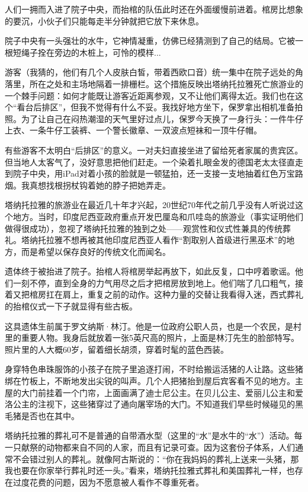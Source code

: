\documentclass[12pt,oneside]{book}
\begin{document}
人们一拥而入进了院子中央，而抬棺的队伍此时还在外面缓慢前进着。棺房比想象的要沉，小伙子们只能每走半分钟就把它放下来休息。

院子中央有一头强壮的水牛，它神情凝重，仿佛已经猜测到了自己的结局。它被一根短绳子拴在旁边的木桩上，可怜的模样...

游客（我猜的，他们有几个人皮肤白皙，带着西欧口音）统一集中在院子远处的角落里，所在之处和主场地隔着一排栅栏。这个措施反映出塔纳托拉雅死亡旅游业的一个棘手问题：如何才能既让游客近距离参观，又不让他们离得太近。我们也在这个“看台后排区”，但我不觉得有什么不妥。我找好地方坐下，保罗拿出相机准备拍照。为了让自己在闷热潮湿的天气里好过点儿，保罗今天换了一身行头：一件牛仔上衣、一条牛仔工装裤、一个警长徽章、一双波点短袜和一顶牛仔帽。

有些游客不太明白“后排区”的意义。一对夫妇直接坐进了留给死者家属的贵宾区。但当地人太客气了，没好意思把他们赶走。一个染着扎眼金发的德国老太太径直走到院子中央，用iPad对着小孩的脸就是一顿猛拍，还一支接一支地抽着红色万宝路烟。我真想找根拐杖钩着她的脖子把她弄走。

塔纳托拉雅的旅游业在最近几十年才兴起，20世纪70年代之前几乎没有人听说过这个地方。当时，印度尼西亚政府重点开发巴厘岛和爪哇岛的旅游业（事实证明他们做得很成功），忽视了塔纳托拉雅的独到之处——观赏性和仪式性兼具的传统葬礼。塔纳托拉雅不想再被其他印度尼西亚人看作“割取别人首级进行黑巫术”的地方，而是希望以保存良好的传统文化而闻名。

遗体终于被抬进了院子。抬棺人将棺房举起再放下，如此反复，口中哼着歌谣。他们一刻不停，直到全身的力气用尽之后才把棺房放到地上。他们喘了几口粗气，接着又把棺房扛在肩上，重复之前的动作。这种力量的交替让我看得入迷，西式葬礼的抬棺仪式一下子就显得有些古板。

这具遗体生前属于罗文纳斯·林汀。他是一位政府公职人员，也是一个农民，是村里的重要人物。我身后就放着一张5英尺高的照片，上面是林汀先生的脸部特写。照片里的人大概60岁，留着细长胡须，穿着时髦的蓝色西装。

身穿特色串珠服饰的小孩子在院子里追逐打闹，不时给搬运活猪的人让路。这些猪绑在竹板上，不断地发出尖锐的叫声。几个人把猪抬到屋后宾客看不见的地方。主屋的大门前挂着一个门帘，上面画满了迪士尼公主。在贝儿公主、爱丽儿公主和爱洛公主的注视下，这些猪穿过了通向屠宰场的大门。不知道我们早些时候碰见的黑毛猪是否也在其中。

塔纳托拉雅的葬礼可不是普通的自带酒水型（这里的“水”是水牛的“水”）活动。每一只献祭的动物都来自不同的人家，而且有记录可查。因为这套份子体系，人们通常不会错过别人的葬礼。就像阿古斯说的：“你在我妈妈的葬礼上送来一头猪，那我也要在你家举行葬礼时还一头。”看来，塔纳托拉雅式葬礼和美国葬礼一样，也存在过度花费的问题，因为不愿意被人看作不尊重死者。
\end{document}
